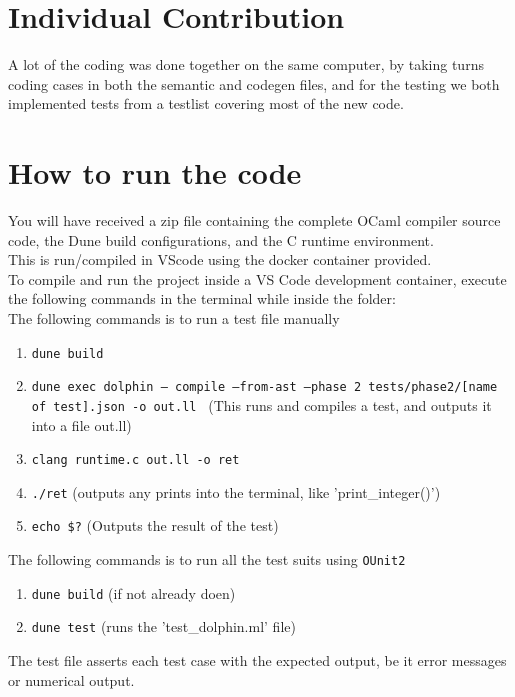 \documentclass[12pt]{article}
\begin{document}
\section*{Individual Contribution}
A lot of the coding was done together on the same computer, by taking turns coding cases in both the semantic and codegen files, and for the testing 
we both implemented tests from a testlist covering most of the new code.
\section*{How to run the code}
You will have received a zip file containing the complete OCaml compiler source code, the Dune build configurations, and the C runtime environment.\\
\newline
This is run/compiled in VScode using the docker container provided.\\
To compile and run the project inside a VS Code development container, execute the following commands in the terminal while inside the folder:\\
The following commands is to run a test file manually
\begin{enumerate}
    \item \texttt{dune build} 
    \item \texttt{dune exec dolphin -- compile --from-ast --phase 2 tests/phase2/[name of test].json -o out.ll  } (This runs and compiles a test, and outputs it into a file out.ll)
    \item \texttt{clang runtime.c out.ll -o ret} 
    \item \texttt{./ret} (outputs any prints into the terminal, like 'print\_integer()')
    \item \texttt{echo \$?} (Outputs the result of the test)
\end{enumerate}
The following commands is to run all the test suits using \texttt{OUnit2}
\begin{enumerate}
    \item \texttt{dune build} (if not already doen)
    \item \texttt{dune test} (runs the 'test\_dolphin.ml' file) 
\end{enumerate}
The test file asserts each test case with the expected output, be it error messages or numerical output.
\end{document}
